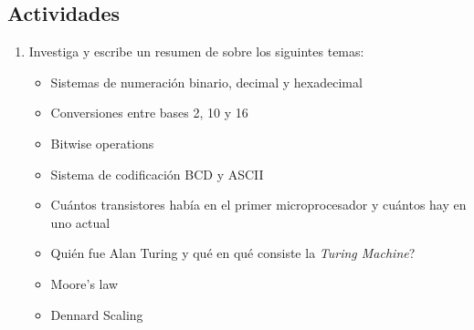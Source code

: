 \documentclass[11pt,letterpaper]{article}
\begin{document}
\subsection*{Actividades}
\begin{enumerate}[label=\arabic*)]
    \item Investiga y escribe un resumen de sobre los siguintes temas:
    \begin{itemize}
        \item Sistemas de numeración binario, decimal y hexadecimal
        \item Conversiones entre bases 2, 10 y 16
        \item Bitwise operations
        \item Sistema de codificación BCD y ASCII
        \item Cuántos transistores había en el primer microprocesador y cuántos hay en uno actual
        \item Quién fue Alan Turing y qué en qué consiste la \textit{Turing Machine}?
        \item Moore's law
        \item Dennard Scaling
    \end{itemize}
\end{enumerate}


    
    
    
    
  
\end{document}
